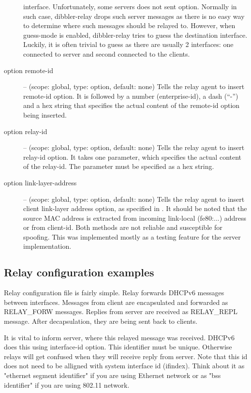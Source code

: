 \begin{description}
        interface. Unfortunately, some servers does not sent  option.
        Normally in such case, dibbler-relay drops such server messages as there is no
        easy way to determine where such messages should be relayed to. However, when
        guess-mode is enabled, dibbler-relay tries to guess the destination interface.
        Luckily, it is often trivial to guess as there are usually 2 interfaces: one
        connected to server and second connected to the clients.
\item[option remote-id] -- (scope: global, type: option, default: none)
        Tells the relay agent to insert remote-id option. It is followed by a
        number (enterprise-id), a dash (``-'') and a hex string that specifies
        the actual content of the remote-id option being inserted.
\item[option relay-id] -- (scope: global, type: option, default: none)
        Tells the relay agent to insert relay-id option. It takes one parameter,
        which specifies the actual content of the relay-id. The parameter must
        be specified as a hex string.
\item[option link-layer-address] -- (scope: global, type: option, default: none)
        Tells the relay agent to insert client link-layer address option, as
        specified in \cite{rfc6939}. It should be noted that the source MAC
        address is extracted from incoming link-local (fe80:...) address or
        from client-id. Both methods are not reliable and susceptible for
        spoofing. This was implemented mostly as a testing feature for the
        server implementation.
\end{description}

\subsection{Relay configuration examples}
\label{example-relay}

Relay configuration file is fairly simple. Relay forwards DHCPv6
messages between interfaces. Messages from client are encapsulated and
forwarded as RELAY\_FORW messages. Replies from server are received as
RELAY\_REPL message. After decapsulation, they are being sent back to
clients.

It is vital to inform server, where this relayed message was
received. DHCPv6 does this using interface-id option. This identifier
must be unique. Otherwise relays will get confused when they will
receive reply from server. Note that this id does not need to be
alligned with system interface id (ifindex). Think about it as
"ethernet segment identifier" if you are using Ethernet network or as
"bss identifier" if you are using 802.11 network.

